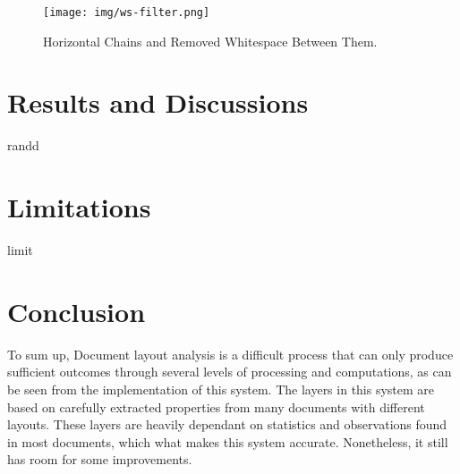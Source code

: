 \documentclass[12pt]{report}
\begin{document}
    \begin{figure}[htbp]
        \centerline{\texttt{[image: img/ws-filter.png]}}
        \caption{Horizontal Chains and Removed Whitespace Between Them.}
        \label{img:ws-filter}
    \end{figure}


    
    \chapter{Results and Discussions}\label{ch:3}
    randd

    \chapter{Limitations}\label{ch:4}
    limit


    \chapter{Conclusion}\label{ch:5}

    To sum up, Document layout analysis is a difficult process that can only produce sufficient outcomes through several
    levels of processing and computations, as can be seen from the implementation of this system.
    The layers in this system are based on carefully extracted properties from many documents with different layouts.
    These layers are heavily dependant on statistics and observations found in most documents, which what makes this
    system accurate.
    Nonetheless, it still has room for some improvements.

    
    
\end{document}
